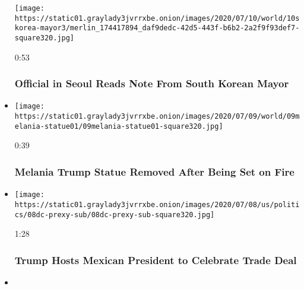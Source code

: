 \begin{itemize}
  \texttt{[image: https://static01.graylady3jvrrxbe.onion/images/2020/07/10/world/10skorea-mayor3/merlin\_174417894\_daf9dedc-42d5-443f-b6b2-2a2f9f93def7-square320.jpg]}

  0:53

  \hypertarget{official-in-seoul-reads-note-from-south-korean-mayor}{%
  \subsubsection{Official in Seoul Reads Note From South Korean
  Mayor}\label{official-in-seoul-reads-note-from-south-korean-mayor}}
\item
  \href{https://www.nytimes3xbfgragh.onion/video/us/100000007231708/melania-trump-statue-removed-after-being-set-on-fire.html?action=click\&module=video-series-bar\&region=header\&pgtype=Article\&playlistId=video/world}{}

  \texttt{[image: https://static01.graylady3jvrrxbe.onion/images/2020/07/09/world/09melania-statue01/09melania-statue01-square320.jpg]}

  0:39

  \hypertarget{melania-trump-statue-removed-after-being-set-on-fire}{%
  \subsubsection{Melania Trump Statue Removed After Being Set on
  Fire}\label{melania-trump-statue-removed-after-being-set-on-fire}}
\item
  \href{https://www.nytimes3xbfgragh.onion/video/us/100000007230340/trump-hosts-mexican-president-to-celebrate-trade-deal.html?action=click\&module=video-series-bar\&region=header\&pgtype=Article\&playlistId=video/world}{}

  \texttt{[image: https://static01.graylady3jvrrxbe.onion/images/2020/07/08/us/politics/08dc-prexy-sub/08dc-prexy-sub-square320.jpg]}

  1:28

  \hypertarget{trump-hosts-mexican-president-to-celebrate-trade-deal}{%
  \subsubsection{Trump Hosts Mexican President to Celebrate Trade
  Deal}\label{trump-hosts-mexican-president-to-celebrate-trade-deal}}
\item
  \href{https://www.nytimes3xbfgragh.onion/video/us/100000007227750/family-and-friends-mourn-killed-iraqi-analyst.html?action=click\&module=video-series-bar\&region=header\&pgtype=Article\&playlistId=video/world}{}


\end{itemize}
